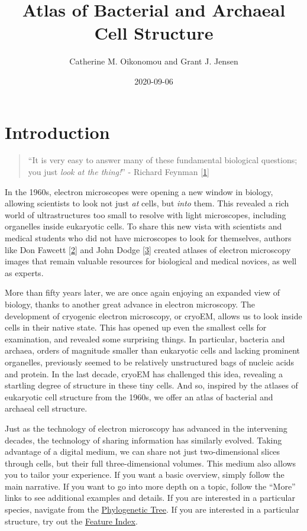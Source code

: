 \documentclass[]{tufte-book}
\title{Atlas of Bacterial and Archaeal Cell Structure}
\author{Catherine M. Oikonomou and Grant J. Jensen}
\date{2020-09-06}
\begin{document}
\maketitle



{
\setcounter{tocdepth}{1}
\tableofcontents
}

\hypertarget{introduction}{%
\chapter*{Introduction}\label{introduction}}

\begin{quote}
``It is very easy to answer many of these fundamental biological questions; you just \emph{look at the thing!}''
- Richard Feynman {[}\protect\hyperlink{ref-feynman1960}{1}{]}
\end{quote}

In the 1960s, electron microscopes were opening a new window in biology, allowing scientists to look not just \emph{at} cells, but \emph{into} them. This revealed a rich world of ultrastructures too small to resolve with light microscopes, including organelles inside eukaryotic cells. To share this new vista with scientists and medical students who did not have microscopes to look for themselves, authors like Don Fawcett {[}\protect\hyperlink{ref-fawcett1966}{2}{]} and John Dodge {[}\protect\hyperlink{ref-dodge1968}{3}{]} created atlases of electron microscopy images that remain valuable resources for biological and medical novices, as well as experts.

More than fifty years later, we are once again enjoying an expanded view of biology, thanks to another great advance in electron microscopy. The development of cryogenic electron microscopy, or cryoEM, allows us to look inside cells in their native state. This has opened up even the smallest cells for examination, and revealed some surprising things. In particular, bacteria and archaea, orders of magnitude smaller than eukaryotic cells and lacking prominent organelles, previously seemed to be relatively unstructured bags of nucleic acids and protein. In the last decade, cryoEM has challenged this idea, revealing a startling degree of structure in these tiny cells. And so, inspired by the atlases of eukaryotic cell structure from the 1960s, we offer an atlas of bacterial and archaeal cell structure.

Just as the technology of electron microscopy has advanced in the intervening decades, the technology of sharing information has similarly evolved. Taking advantage of a digital medium, we can share not just two-dimensional slices through cells, but their full three-dimensional volumes. This medium also allows you to tailor your experience. If you want a basic overview, simply follow the main narrative. If you want to go into more depth on a topic, follow the ``More'' links to see additional examples and details. If you are interested in a particular species, navigate from the \protect\hyperlink{tree}{Phylogenetic Tree}. If you are interested in a particular structure, try out the \protect\hyperlink{feature-index}{Feature Index}.
\end{document}

